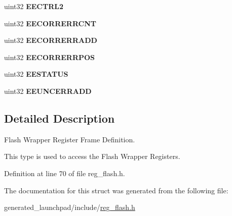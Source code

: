 \begin{DoxyCompactItemize}
uint32 {\bfseries E\+E\+C\+T\+R\+L2}
\item 
\mbox{\label{structflashWBase_a70009bff416188fadaad321da1339935}} 
uint32 {\bfseries E\+E\+C\+O\+R\+R\+E\+R\+R\+C\+NT}
\item 
\mbox{\label{structflashWBase_ad11a81fcb73ffa1fd0b761cb3e0cc221}} 
uint32 {\bfseries E\+E\+C\+O\+R\+R\+E\+R\+R\+A\+DD}
\item 
\mbox{\label{structflashWBase_a0495381245953a8dcf5cae449d402d72}} 
uint32 {\bfseries E\+E\+C\+O\+R\+R\+E\+R\+R\+P\+OS}
\item 
\mbox{\label{structflashWBase_a87c6ea37c0956441a5c1c0556fabcd29}} 
uint32 {\bfseries E\+E\+S\+T\+A\+T\+US}
\item 
\mbox{\label{structflashWBase_ad344c0d2d3f9745b51f202ec7d1a9464}} 
uint32 {\bfseries E\+E\+U\+N\+C\+E\+R\+R\+A\+DD}
\end{DoxyCompactItemize}


\subsection{Detailed Description}
Flash Wrapper Register Frame Definition. 

This type is used to access the Flash Wrapper Registers. 

Definition at line 70 of file reg\+\_\+flash.\+h.



The documentation for this struct was generated from the following file\+:\begin{DoxyCompactItemize}
\item 
generated\+\_\+launchpad/include/\mbox{\hyperlink{reg__flash_8h}{reg\+\_\+flash.\+h}}\end{DoxyCompactItemize}

